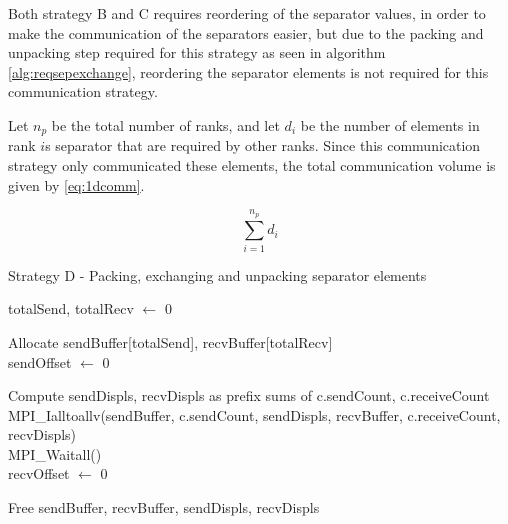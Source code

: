 Both strategy B and C requires reordering of the separator values, in order to make the communication of the separators easier, but due to the packing and unpacking step required for this strategy as seen in algorithm \ref{alg:reqsepexchange}, reordering the separator elements is not required for this communication strategy.
\medskip

Let \(n_{p}\) be the total number of ranks, and let \(d_{i}\) be the number of elements in rank \(i\)s separator that are required by other ranks. Since this communication strategy only communicated these elements, the total communication volume is given by \ref{eq:1dcomm}.

\begin{equation}
    \label{eq:1dcomm}
    \sum_{i=1}^{n_{p}} d_{i} 
\end{equation}

\begin{algorithm}[H]
    \label{alg:reqsepexchange}
    \caption{Strategy D - Packing, exchanging and unpacking separator elements}
    \SetAlgoVlined

    totalSend, totalRecv $\gets$ 0\\

    Allocate sendBuffer[totalSend], recvBuffer[totalRecv]\\

    sendOffset $\gets$ 0\\

    Compute sendDispls, recvDispls as prefix sums of c.sendCount, c.receiveCount\\

    MPI\_Ialltoallv(sendBuffer, c.sendCount, sendDispls, recvBuffer, c.receiveCount, recvDispls)\\

    MPI\_Waitall()\\

    recvOffset $\gets$ 0\\

    Free sendBuffer, recvBuffer, sendDispls, recvDispls\\
\end{algorithm}




